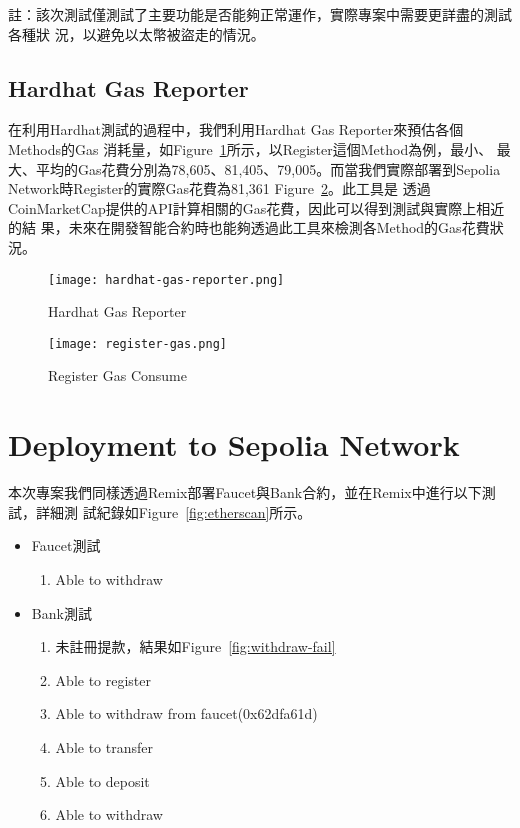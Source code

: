 註：該次測試僅測試了主要功能是否能夠正常運作，實際專案中需要更詳盡的測試各種狀
況，以避免以太幣被盜走的情況。

\subsection{Hardhat Gas Reporter}

 在利用Hardhat測試的過程中，我們利用Hardhat Gas Reporter來預估各個Methods的Gas
 消耗量，如Figure~\ref{fig:gas-reporter}所示，以Register這個Method為例，最小、
 最大、平均的Gas花費分別為78,605、81,405、79,005。而當我們實際部署到Sepolia
 Network時Register的實際Gas花費為81,361 Figure~\ref{fig:register-gas}。此工具是
 透過CoinMarketCap提供的API計算相關的Gas花費，因此可以得到測試與實際上相近的結
 果，未來在開發智能合約時也能夠透過此工具來檢測各Method的Gas花費狀況。
 
\begin{figure}[H]
    \centering
    \texttt{[image: hardhat-gas-reporter.png]}
    \caption{Hardhat Gas Reporter}
    \label{fig:gas-reporter}
\end{figure}

\begin{figure}[H]
    \centering
    \texttt{[image: register-gas.png]}
    \caption{Register Gas Consume}
    \label{fig:register-gas}
\end{figure}



\section{Deployment to Sepolia Network}

本次專案我們同樣透過Remix部署Faucet與Bank合約，並在Remix中進行以下測試，詳細測
試紀錄如Figure~\ref{fig:etherscan}所示。

\begin{itemize}
  \item Faucet測試
  \begin{enumerate}
    \item Able to withdraw
  \end{enumerate}
  \item Bank測試
  \begin{enumerate}
    \item 未註冊提款，結果如Figure~\ref{fig:withdraw-fail}
    \item Able to register
    \item Able to withdraw from faucet(0x62dfa61d)
    \item Able to transfer
    \item Able to deposit
    \item Able to withdraw
  \end{enumerate}
\end{itemize}

